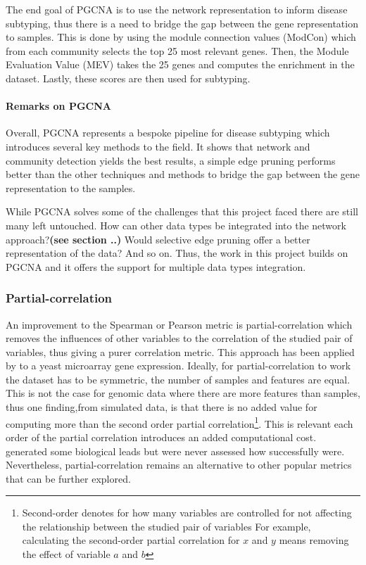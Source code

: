 The end goal of PGCNA is to use the network representation to inform disease subtyping, thus there is a need to bridge the gap between the gene representation to samples. This is done by using the module connection values (ModCon) which from each community selects the top 25 most relevant genes. Then, the Module Evaluation Value (MEV) takes the 25 genes and computes the enrichment in the dataset. Lastly, these scores are then used for subtyping.

\paragraph*{Remarks on PGCNA}

Overall, PGCNA represents a bespoke pipeline for disease subtyping which introduces several key methods to the field. It shows that network and community detection yields the best results, a simple edge pruning performs better than the other techniques and methods to bridge the gap between the gene representation to the samples.

While PGCNA solves some of the challenges that this project faced there are still many left untouched. How can other data types be integrated into the network approach?\textbf{(see section ..)} Would selective edge pruning offer a better representation of the data? And so on. Thus, the work in this project builds on PGCNA and it offers the support for multiple data types integration.

\subsubsection{Partial-correlation} \label{s:lit:partial-corr}

An improvement to the Spearman or Pearson metric is partial-correlation which removes the influences of other variables to the correlation of the studied pair of variables, thus giving a purer correlation metric. This approach has been applied by \citet{De_la_Fuente2004-ts} to a yeast microarray gene expression. Ideally, for partial-correlation to work the dataset has to be symmetric, the number of samples and features are equal. This is not the case for genomic data where there are more features than samples, thus one finding,from simulated data, is that there is no added value for computing more than the second order partial correlation\footnote{Second-order denotes for how many variables are controlled for not affecting the relationship between the studied pair of variables For example, calculating the second-order partial correlation for $x$ and $y$ means removing the effect of variable $a$ and $b$}. This is relevant each order of the partial correlation introduces an added computational cost. \citet{De_la_Fuente2004-ts} generated some biological leads but were never assessed how successfully were. Nevertheless, partial-correlation remains an alternative to other popular metrics that can be further explored.

